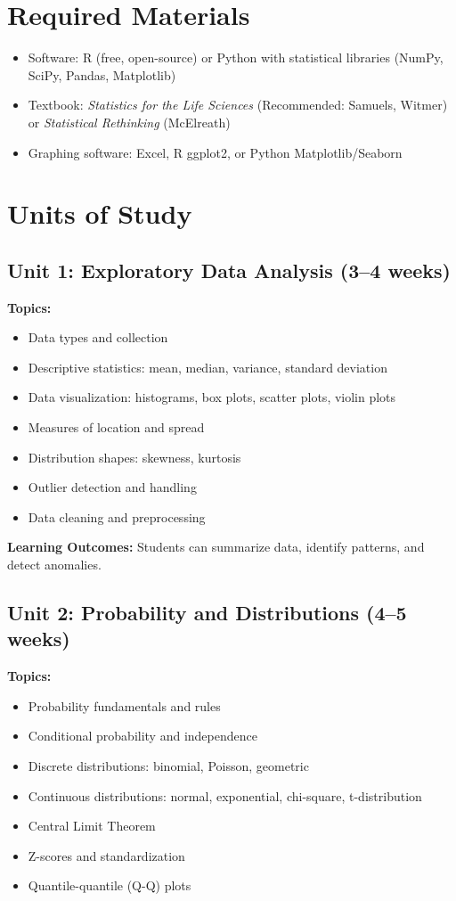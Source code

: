 \documentclass[12pt,oneside]{book}
\begin{document}
\section{Required Materials}

\begin{itemize}
    \item Software: R (free, open-source) or Python with statistical libraries (NumPy, SciPy, Pandas, Matplotlib)
    \item Textbook: \textit{Statistics for the Life Sciences} (Recommended: Samuels, Witmer) or \textit{Statistical Rethinking} (McElreath)
    \item Graphing software: Excel, R ggplot2, or Python Matplotlib/Seaborn
\end{itemize}

\section{Units of Study}

\subsection{Unit 1: Exploratory Data Analysis (3--4 weeks)}

\textbf{Topics:}
\begin{itemize}
    \item Data types and collection
    \item Descriptive statistics: mean, median, variance, standard deviation
    \item Data visualization: histograms, box plots, scatter plots, violin plots
    \item Measures of location and spread
    \item Distribution shapes: skewness, kurtosis
    \item Outlier detection and handling
    \item Data cleaning and preprocessing
\end{itemize}

\textbf{Learning Outcomes:} Students can summarize data, identify patterns, and detect anomalies.

\subsection{Unit 2: Probability and Distributions (4--5 weeks)}

\textbf{Topics:}
\begin{itemize}
    \item Probability fundamentals and rules
    \item Conditional probability and independence
    \item Discrete distributions: binomial, Poisson, geometric
    \item Continuous distributions: normal, exponential, chi-square, t-distribution
    \item Central Limit Theorem
    \item Z-scores and standardization
    \item Quantile-quantile (Q-Q) plots
\end{itemize}
\end{document}
